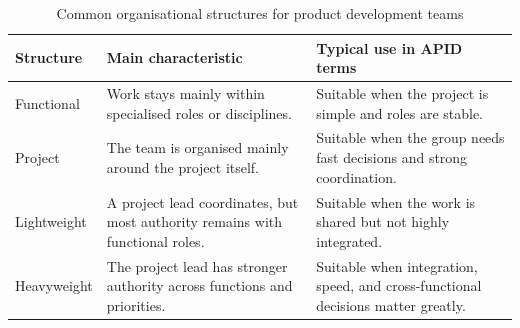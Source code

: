 \begin{table}[htbp]
\centering
\caption{Common organisational structures for product development teams}
\label{tab:session2-organisational-structures}
\renewcommand{\arraystretch}{1.2}
\begin{tabularx}{\textwidth}{|>{\raggedright\arraybackslash}p{}|>{\raggedright\arraybackslash}X|>{\raggedright\arraybackslash}p{}|}
\hline
\textbf{Structure} & \textbf{Main characteristic} & \textbf{Typical use in APID terms} \\
\hline
Functional & Work stays mainly within specialised roles or disciplines. & Suitable when the project is simple and roles are stable. \\
\hline
Project & The team is organised mainly around the project itself. & Suitable when the group needs fast decisions and strong coordination. \\
\hline
Lightweight & A project lead coordinates, but most authority remains with functional roles. & Suitable when the work is shared but not highly integrated. \\
\hline
Heavyweight & The project lead has stronger authority across functions and priorities. & Suitable when integration, speed, and cross-functional decisions matter greatly. \\
\hline
\end{tabularx}
\end{table}